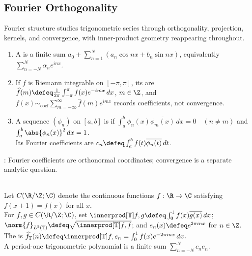 \subsection{Fourier Orthogonality}

%


Fourier structure studies trigonometric series through orthogonality, projection, kernels, and convergence, with inner-product geometry reappearing throughout.

\begin{definition} \label{def:fourier-core-objects} 
\begin{enumerate}[label=(\roman*)]
\setlength{\itemsep}{0pt}
\item A  is a finite sum $a_0+\sum\limits_{n=1}^{N}(a_n\cos nx+b_n\sin nx)$, equivalently $\sum\limits_{n=-N}^{N}\alpha_ne^{inx}$.
\item If $f$ is Riemann integrable on $[-\pi,\pi]$, its  are $\widehat{f}(m)\defeq \frac{1}{2\pi}\int_{-\pi}^{\pi}f(x)e^{-imx}\,dx$, $m\in\Z$, and $f(x)\sim_{\mathrm{coef}}\sum\limits_{m=-\infty}^{\infty}\widehat{f}(m)e^{imx}$ records coefficients, not convergence.
\item A sequence $(\phi_n)$ on $[a,b]$ is  if $\int_a^b \phi_n(x)\overline{\phi_m(x)}\,dx=0\quad(n\neq m)$ and $\int_a^b\abs{\phi_n(x)}^2\,dx=1$.\\
Its Fourier coefficients are $c_n\defeq\int_a^b f(t)\overline{\phi_n(t)}\,dt$.
\end{enumerate}
: Fourier coefficients are orthonormal coordinates; convergence is a separate analytic question.
\end{definition}

\begin{definition} \label{def:period-one-fourier-normalization} \\
Let $C(\R/\Z;\C)$ denote the continuous functions $f:\R\to\C$ satisfying $f(x+1)=f(x)$ for all $x$. \\
For $f,g\in C(\R/\Z;\C)$, set $\innerprod[\mathbb{T}]{f,g}\defeq \int_0^1 f(x)\overline{g(x)}\,dx$; $\norm{f}_{L^2(\mathbb{T})}\defeq \sqrt{\innerprod[\mathbb{T}]{f,f}}$; and $e_n(x)\defeq e^{2\pi i n x}$ for $n\in\Z$.\\
The  is $\widehat{f}_{\mathbb{T}}(n)\defeq \innerprod[\mathbb{T}]{f,e_n}=\int_0^1 f(x)e^{-2\pi i n x}\,dx$.\\
A period-one trigonometric polynomial is a finite sum $\sum_{n=-N}^{N}c_ne_n$.
\end{definition}

